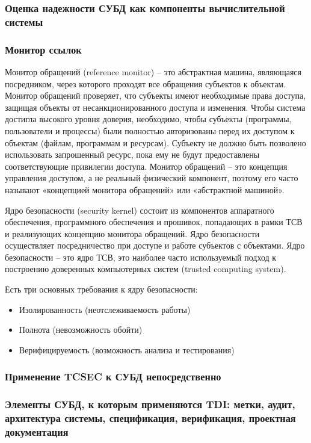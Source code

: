 \subsubsection{Оценка надежности СУБД как компоненты вычислительной системы}
\subsubsection{Монитор ссылок}
Монитор обращений (reference monitor) – это абстрактная машина, являющаяся посредником, через которого проходят все обращения субъектов к объектам. Монитор обращений проверяет, что субъекты имеют необходимые права доступа, защищая объекты от несанкционированного доступа и изменения.
Чтобы система достигла высокого уровня доверия, необходимо, чтобы субъекты (программы, пользователи и процессы) были полностью авторизованы перед их доступом к объектам (файлам, программам и ресурсам).
Субъекту не должно быть позволено использовать запрошенный ресурс, пока ему не будут предоставлены соответствующие привилегии доступа. Монитор обращений – это концепция управления доступом, а не реальный физический компонент, поэтому его часто называют «концепцией монитора обращений» или «абстрактной машиной». \cite{CISSP}

Ядро безопасности (security kernel) состоит из компонентов аппаратного обеспечения, программного обеспечения и прошивок, попадающих в рамки ТСВ и реализующих концепцию монитора обращений.
Ядро безопасности осуществляет посредничество при доступе и работе субъектов с объектами. Ядро безопасности – это ядро ТСВ, это наиболее часто используемый подход к построению доверенных компьютерных систем (trusted computing system). \cite{CISSP}

Есть три основных требования к ядру безопасности:
\begin{itemize}
	\item Изолированность (неотслеживаемость работы)
	\item Полнота (невозможность обойти)
	\item Верифицируемость (возможность анализа и тестирования)
\end{itemize}

\subsubsection{Применение TCSEC к СУБД непосредственно}
%
%
\subsubsection{Элементы СУБД, к которым применяются TDI: метки, аудит, архитектура системы, спецификация, верификация, проектная документация}

